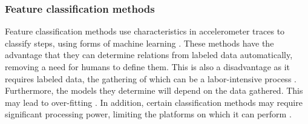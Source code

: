 \subsubsection{Feature classification methods} 
Feature classification methods use characteristics in accelerometer traces to classify steps, using forms of machine learning \cite{Brajdic2013}. These methods have the advantage that they can determine relations from labeled data automatically, removing a need for humans to define them. This is also a disadvantage as it requires labeled data, the gathering of which can be a labor-intensive process \cite{Bulling2014}. Furthermore, the models they determine will depend on the data gathered. This may lead to over-fitting \cite{Bulling2014}. In addition, certain classification methods may require significant processing power, limiting the platforms on which it can perform \cite{Yang2014}.

